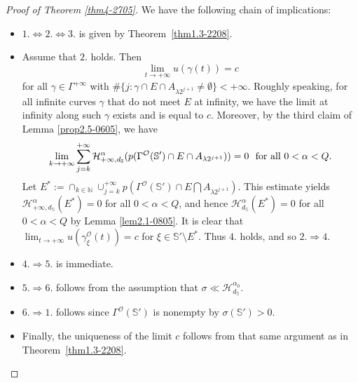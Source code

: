 \documentclass[10pt]{amsart}
\numberwithin{equation}{section}
\newcommand{\Ha}{\mathcal{H}}
\begin{document}
 \begin{proof}[Proof of Theorem \ref{thm4-2705}]
 We have the following chain of implications:
 \begin{itemize}
     \item $1.\Leftrightarrow 2.\Leftrightarrow 3.$ is given by Theorem~\ref{thm1.3-2208}.
     \item Assume that $2.$ holds.  Then 
	\[
		\lim_{t\to{+\infty}} u(\gamma(t))=c
	\]
	for all $\gamma\in\Gamma^{+\infty}$ with $\#\{j: \gamma\cap E\cap A_{\lambda 2^{j+1}}\neq\emptyset\}<{+\infty}$.
 Roughly speaking, for all infinite curves $\gamma$ that do not meet $E$ at infinity, we have the limit at infinity along such $\gamma$ exists and is equal to $c$.
{
 Moreover, 
	by the third claim  of Lemma \ref{prop2.5-0605}, we have 
	\[
		\lim_{k\to{+\infty}}\sum_{j=k}^{+\infty}\mathcal H^\alpha_{+\infty, d_{\mathbb S}}(p(\Gamma^{\mathcal O}(\mathbb S')\cap E\cap A_{\lambda 2^{j+1}}))=0 \text{\rm \ \ for all $0<\alpha<Q$}.
	\]  Let $E^*:= \cap_{k\in\mathbb N}\cup_{j=k}^{+\infty} p( \Gamma^{\mathcal O}(\mathbb S')\cap E\bigcap A_{\lambda 2^{j+1}})$. This estimate yields $\mathcal H^\alpha_{+\infty, d_{\mathbb S}}(E^*)=0$ for all $0<\alpha<Q$, and hence $\mathcal H_{d_{\mathbb S}}^\alpha(E^*)=0$ for all $0<\alpha<Q$ by Lemma \ref{lem2.1-0805}. 
	}
	It is clear that $\lim_{t\to{+\infty}}u(\gamma^{\mathcal O}_\xi(t))=c$ for {
	$\xi\in\mathbb S'\setminus E^*$}.  Thus $4.$ holds, and so $2.\Rightarrow 4.$  
    \item $4.\Rightarrow 5.$ is immediate.
    \item {
    $5.\Rightarrow 6.$ follows from the assumption that $\sigma\ll \Ha^{\alpha_0}_{d_{\mathbb S}}$.}
    \item {
    $6.\Rightarrow 1.$ follows since $\Gamma^\mathcal{O}(\mathbb{S}')$ is nonempty by $\sigma(\mathbb S')>0$.}
    \item Finally, the uniqueness of the limit $c$ follows from that same argument as in Theorem~\ref{thm1.3-2208}.\qedhere
 \end{itemize}
	

\end{proof}
\end{document}

